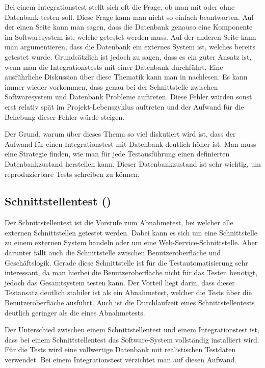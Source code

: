 \SuperPar
Bei einem Integrationstest stellt sich oft die Frage, ob man mit oder ohne Datenbank testen soll. Diese Frage kann man nicht so einfach beantworten. Auf der einen Seite kann man sagen, dass die Datenbank genauso eine Komponente im Softwaresystem ist, welche getestet werden muss. Auf der anderen Seite kann man argumentieren, dass die Datenbank ein externes System ist, welches bereits getestet wurde. Grundsätzlich ist jedoch zu sagen, dass es ein guter Ansatz ist, wenn man die Integrationstests mit einer Datenbank durchführt. Eine ausführliche Diskussion über diese Thematik kann man in  \cite{intTest} nachlesen. Es kann immer wieder vorkommen, dass genau bei der Schnittstelle zwischen Softwaresystem und Datenbank Probleme auftreten. Diese Fehler würden sonst erst relativ spät im Projekt-Lebenszyklus auftreten und der Aufwand für die Behebung dieser Fehler würde steigen.

\SuperPar
Der Grund, warum über dieses Thema so viel diskutiert wird ist, dass der Aufwand für einen Integrationstest mit Datenbank deutlich höher ist. Man muss eine Strategie finden, wie man für jede Testausführung einen definierten Datenbankzustand herstellen kann. Dieser Datenbankzustand ist sehr wichtig, um reproduzierbare Tests schreiben zu können. 


\subsection{Schnittstellentest ()}

Der Schnittstellentest ist die Vorstufe zum Abnahmetest, bei welcher alle externen Schnittstellen getestet werden. Dabei kann es sich um eine Schnittstelle zu einem externen System handeln oder um eine Web-Service-Schnittstelle. Aber darunter fällt auch die Schnittstelle zwischen Benutzeroberfläche und Geschäftslogik. Gerade diese Schnittstelle ist für die Testautomatisierung sehr interessant, da man hierbei die Benutzeroberfläche nicht für das Testen benötigt, jedoch das Gesamtsystem testen kann. Der Vorteil liegt darin, dass dieser Testansatz deutlich stabiler ist als ein Abnahmetest, welcher die Tests über die Benutzeroberfläche ausführt. Auch ist die Durchlaufzeit eines Schnittstellentests deutlich geringer als die eines Abnahmetests.

\SuperPar
Der Unterschied zwischen einem Schnittstellentest und einem Integrationstest ist, dass bei einem Schnittstellentest das Software-System vollständig installiert wird. Für die Tests wird eine vollwertige Datenbank mit realistischen Testdaten verwendet. Bei einem Integrationstest verzichtet man auf diesen Aufwand.

